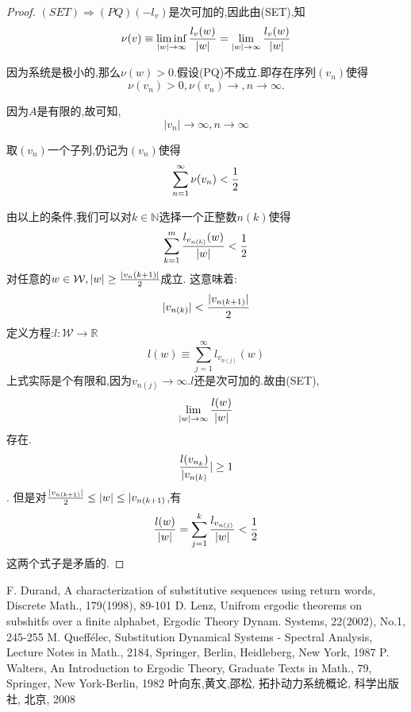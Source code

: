 \documentclass[a4paper,11pt,oneside]{book}
\begin{document}
\begin{proof}
$(SET)\Rightarrow(PQ)$$(-l_v)$是次可加的,因此由(SET),知$$\nu(v)\equiv \liminf_{|w|\to\infty}{l_v(w)\over |w|}=\lim_{|w|\to\infty}{l_v(w)\over |w|}$$

因为系统是极小的,那么$\nu(w)>0$.假设(PQ)不成立.即存在序列$(v_n)$使得
$$\nu(v_n)>0,\nu(v_n)\rightarrow, n\rightarrow \infty.$$

因为$A$是有限的,故可知,$$|v_n|\rightarrow \infty, n\rightarrow \infty$$

取$(v_n)$一个子列,仍记为$(v_n)$使得$$\sum_{n=1}^{\infty}\nu(v_n)<{1\over 2}$$

由以上的条件,我们可以对$k\in\mathbb{N}$选择一个正整数$n(k)$使得
$$\sum_{k=1}^m {l_{v_{n(k)}}(w)\over |w|}<{1\over 2}$$
对任意的$w\in \mathcal{W},|w|\geq {|v_n(k+1)|\over 2}$成立.
这意味着:
$$|v_{n(k)}|<{|v_{n(k+1)}|\over 2}$$
定义方程:$l:\mathcal{W}\rightarrow \mathbb{R}$
$$l(w)\equiv \sum_{j=1}^\infty l_{v_{n(j)}}(w)$$
上式实际是个有限和,因为$v_{n(j)}\rightarrow\infty$.$l$还是次可加的.故由(SET),
$$\lim_{|w|\to\infty}{l(w)\over |w|}$$
存在.
$${l(v_{n_k})\over |v_{n(k)}}|\geq 1$$.
但是对${|v_{n(k+1)}|\over 2}\leq |w| \leq |v_{n(k+1)}$,有
$${l(w)\over |w|}=\sum_{j=1}^k {l_{v_{n(j)}}\over |w|}<\frac{1}{2}$$
这两个式子是矛盾的.
\end{proof}


\renewcommand\bibname{\centerline {参考文献}}
%
%

\begin{thebibliography}{10}
 F. Durand, A characterization of substitutive sequences using return words, Discrete Math., 179(1998), 89-101
 D. Lenz, Unifrom ergodic theorems on subshitfs over a finite alphabet, Ergodic Theory Dynam. Systems, 22(2002), No.1, 245-255
 M. Queff\'elec, Substitution Dynamical Systems - Spectral Analysis, Lecture Notes in Math., 2184, Springer, Berlin, Heidleberg, New York, 1987
 P. Walters, An Introduction to Ergodic Theory, Graduate Texts in Math., 79, Springer, New York-Berlin, 1982
 叶向东,黄文,邵松, 拓扑动力系统概论, 科学出版社, 北京, 2008





\end{thebibliography}
\end{document}
